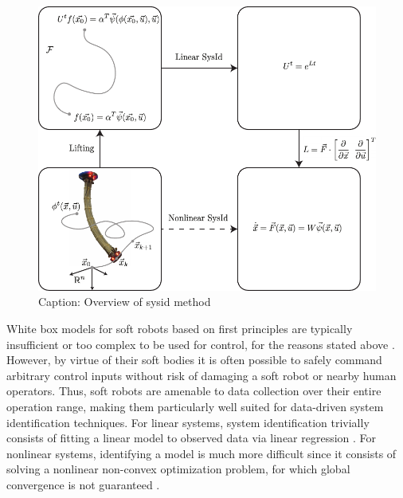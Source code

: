 \begin{figure}[t]
    \centering
    \includegraphics[width=\linewidth]{figures/overviewDiagram_rough.pdf}
    \caption{Caption: Overview of sysid method}
    \label{fig:overview}
\end{figure}

White box models  for soft robots based on first principles are typically insufficient or too complex to be used for control, for the reasons stated above . 
However, by virtue of their soft bodies it is often possible to safely command arbitrary control inputs without risk of damaging a soft robot or nearby human operators.
Thus, soft robots are amenable to data collection over their entire operation range, making them particularly well suited for data-driven system identification techniques.
For linear systems, system identification trivially  consists of fitting a linear model to observed data via linear regression  .
For nonlinear systems, identifying a model is much more difficult since it consists of solving a nonlinear non-convex optimization problem, for which global convergence is not guaranteed .


